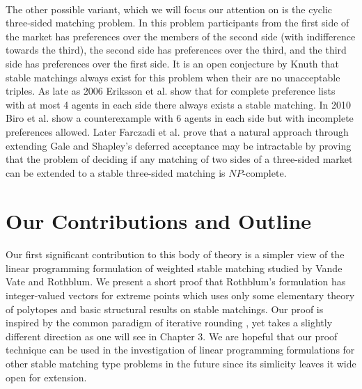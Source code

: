 \paragraph{}
The other possible variant, which we will focus our attention on is the cyclic three-sided matching problem. In this problem participants from the first side of the market has preferences over the members of the second side (with indifference towards the third), the second side has preferences over the third, and the third side has preferences over the first side. It is an open conjecture by Knuth that stable matchings always exist for this problem when their are no unacceptable triples. As late as 2006 Eriksson et al. \cite{eriksson2006three} show that for complete preference lists with at most 4 agents in each side there always exists a stable matching. In 2010 Biro et al. \cite{biro2010three} show a counterexample with 6 agents in each side but with incomplete preferences allowed. Later Farczadi et al. \cite{farczadi2014stable} prove that a natural approach through extending Gale and Shapley's deferred acceptance may be intractable by proving that the problem of deciding if any matching of two sides of a three-sided market can be extended to a stable three-sided matching is $NP$-complete.

\section{Our Contributions and Outline}

\paragraph{}
Our first significant contribution to this body of theory is a simpler view of the linear programming formulation of weighted stable matching studied by Vande Vate and Rothblum. We present a short proof that Rothblum's formulation has integer-valued vectors for extreme points which uses only some elementary theory of polytopes and basic structural results on stable matchings. Our proof is inspired by the common paradigm of iterative rounding \cite{lau2011iterative}, yet takes a slightly different direction as one will see in Chapter $3$. We are hopeful that our proof technique can be used in the investigation of linear programming formulations for other stable matching type problems in the future since its simlicity leaves it wide open for extension.
